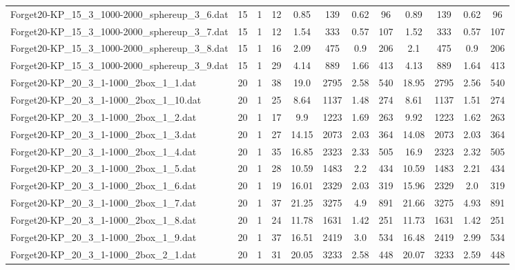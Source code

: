 \begin{sidewaystable}[!ht]
{\begin{tabular}{lccccccccccc}
Forget20-KP\_15\_3\_1000-2000\_sphereup\_3\_6.dat & 15 & 1 & 12 & 0.85 & 139 &  \textcolor{blue2}{0.62} & 96 & 0.89 & 139 &  \textcolor{blue2}{0.62} & 96 \\
Forget20-KP\_15\_3\_1000-2000\_sphereup\_3\_7.dat & 15 & 1 & 12 & 1.54 & 333 &  \textcolor{blue2}{0.57} & 107 & 1.52 & 333 &  \textcolor{blue2}{0.57} & 107 \\
Forget20-KP\_15\_3\_1000-2000\_sphereup\_3\_8.dat & 15 & 1 & 16 & 2.09 & 475 &  \textcolor{blue2}{0.9} & 206 & 2.1 & 475 &  \textcolor{blue2}{0.9} & 206 \\
Forget20-KP\_15\_3\_1000-2000\_sphereup\_3\_9.dat & 15 & 1 & 29 & 4.14 & 889 & 1.66 & 413 & 4.13 & 889 & 1.64 & 413 \\
Forget20-KP\_20\_3\_1-1000\_2box\_1\_1.dat & 20 & 1 & 38 & 19.0 & 2795 & 2.58 & 540 & 18.95 & 2795 &  \textcolor{blue2}{2.56} & 540 \\
Forget20-KP\_20\_3\_1-1000\_2box\_1\_10.dat & 20 & 1 & 25 & 8.64 & 1137 &  \textcolor{blue2}{1.48} & 274 & 8.61 & 1137 & 1.51 & 274 \\
Forget20-KP\_20\_3\_1-1000\_2box\_1\_2.dat & 20 & 1 & 17 & 9.9 & 1223 & 1.69 & 263 & 9.92 & 1223 &  \textcolor{blue2}{1.62} & 263 \\
Forget20-KP\_20\_3\_1-1000\_2box\_1\_3.dat & 20 & 1 & 27 & 14.15 & 2073 &  \textcolor{blue2}{2.03} & 364 & 14.08 & 2073 &  \textcolor{blue2}{2.03} & 364 \\
Forget20-KP\_20\_3\_1-1000\_2box\_1\_4.dat & 20 & 1 & 35 & 16.85 & 2323 & 2.33 & 505 & 16.9 & 2323 &  \textcolor{blue2}{2.32} & 505 \\
Forget20-KP\_20\_3\_1-1000\_2box\_1\_5.dat & 20 & 1 & 28 & 10.59 & 1483 &  \textcolor{blue2}{2.2} & 434 & 10.59 & 1483 & 2.21 & 434 \\
Forget20-KP\_20\_3\_1-1000\_2box\_1\_6.dat & 20 & 1 & 19 & 16.01 & 2329 & 2.03 & 319 & 15.96 & 2329 &  \textcolor{blue2}{2.0} & 319 \\
Forget20-KP\_20\_3\_1-1000\_2box\_1\_7.dat & 20 & 1 & 37 & 21.25 & 3275 &  \textcolor{blue2}{4.9} & 891 & 21.66 & 3275 & 4.93 & 891 \\
Forget20-KP\_20\_3\_1-1000\_2box\_1\_8.dat & 20 & 1 & 24 & 11.78 & 1631 & 1.42 & 251 & 11.73 & 1631 & 1.42 & 251 \\
Forget20-KP\_20\_3\_1-1000\_2box\_1\_9.dat & 20 & 1 & 37 & 16.51 & 2419 & 3.0 & 534 & 16.48 & 2419 &  \textcolor{blue2}{2.99} & 534 \\
Forget20-KP\_20\_3\_1-1000\_2box\_2\_1.dat & 20 & 1 & 31 & 20.05 & 3233 &  \textcolor{blue2}{2.58} & 448 & 20.07 & 3233 & 2.59 & 448 \\

\end{tabular}}
\end{sidewaystable}
